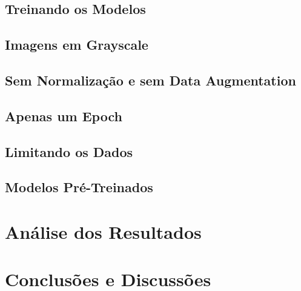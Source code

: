 \documentclass[conference]{IEEEtran}
\begin{document}
\subsection{Treinando os Modelos}

\subsection{Imagens em Grayscale}

\subsection{Sem Normalização e sem Data Augmentation}

\subsection{Apenas um Epoch}

\subsection{Limitando os Dados}

\subsection{Modelos Pré-Treinados}

\section{Análise dos Resultados}




\section{Conclusões e Discussões}



\nocite{*}

\end{document}

